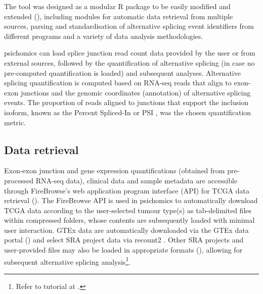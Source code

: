 The tool was designed as a modular R package to be easily modified and extended (), including modules for automatic data retrieval from multiple sources, parsing and standardisation of alternative splicing event identifiers from different programs and a variety of data analysis methodologies.

psichomics can load splice junction read count data provided by the user or from external sources, followed by the quantification of alternative splicing (in case no pre-computed quantification is loaded) and subsequent analyses. Alternative splicing quantification is computed based on RNA-seq reads that align to exon-exon junctions and the genomic coordinates (annotation) of alternative splicing events. The proportion of reads aligned to junctions that support the inclusion isoform, known as the Percent Spliced-In or PSI \cite{wang:2008wa}, was the chosen quantification metric.

\subsection{Data retrieval}

Exon-exon junction and gene expression quantifications (obtained from pre-processed RNA-seq data), clinical data and sample metadata are accessible through FireBrowse's web application program interface (API) for TCGA data retrieval (). The FireBrowse API is used in psichomics to automatically download TCGA data according to the user-selected tumour type(s) as tab-delimited files within compressed folders, whose contents are subsequently loaded with minimal user interaction. GTEx data are automatically downloaded via the GTEx data portal () and select SRA project data via recount2 \cite{collado-torres:2017uw}. Other SRA projects and user-provided files may also be loaded in appropriate formats (), allowing for subsequent alternative splicing analysis\footnote{Refer to tutorial at .}.

